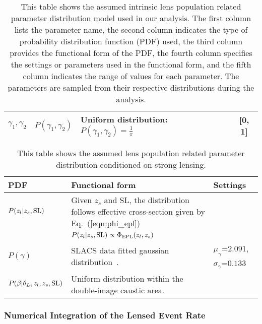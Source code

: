 \documentclass[aps,prd,twocolumn,superscriptaddress,groupedaddress,nofootinbib,showpacs,eqsecnum]{revtex4-1}
\begin{document}
\begin{widetext}
\begin{center}
\begin{table*}[ht!]
\begin{tabular}{|p{2cm}|l|p{6.5cm}|p{3.5cm}|c|}
%
$\gamma_1, \gamma_2$ & $P(\gamma_1, \gamma_2)$ & Uniform distribution: $P(\gamma_1, \gamma_2) = \frac{1}{\pi}$ &  & [0, 1] \\
\hline
\end{tabular}
\caption{This table shows the assumed intrinsic lens population related parameter distribution model used in our analysis. 
The first column lists the parameter name, the second column indicates the type of probability distribution function (PDF) used, the third column provides the functional form of the PDF, the fourth column specifies the settings or parameters used in the functional form, and the fifth column indicates the range of values for each parameter. The parameters are sampled from their respective distributions during the analysis.
}
\label{table:lens_parameters}
\end{table*}
\end{center}
\endgroup
\end{widetext}


\begingroup
\renewcommand{\arraystretch}{1.5} %
\begin{center}
\begin{table}[ht!]
\begin{tabular}{l|p{3.9cm}|p{1.5cm}}
\hline\hline
PDF & Functional form & Settings \\
\hline
$P(z_l|z_s, {\rm SL})$ & Given $z_s$ and SL, the distribution follows effective cross-section given by Eq.~(\ref{eqn:phi_epl})  &  \\
& $P(z_l|z_s, {\rm SL}) \propto \Phi_{{\rm EPL}}(z_l, z_s)$ &   \\
%
$P(\gamma)$ & SLACS data fitted gaussian distribution~\cite{Sonnenfeld2024}. & $\mu_{\gamma}$=$2.091$, $\sigma_{\gamma}$=$0.133$ \\
%
$P(\beta|\theta_L, z_l, z_s, {\rm SL})$ & Uniform distribution within the double-image caustic area. &  \\
\hline
\end{tabular}
\caption{This table shows the assumed lens population related parameter distribution conditioned on strong lensing.
}
\label{table:GW_parameters}
\end{table}
\end{center}
\endgroup

\subsubsection{Numerical Integration of the Lensed Event Rate}
\end{document}
